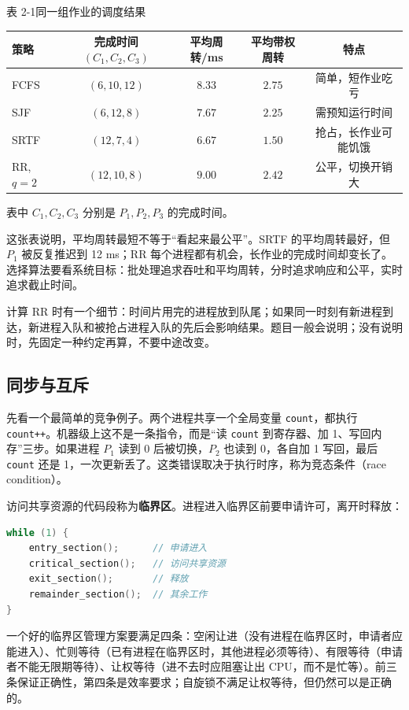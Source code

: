 \begin{tablebox}{表 2-1\quad 同一组作业的调度结果}
\centering
\begin{tabular}{lcccc}
\toprule
策略 & 完成时间 $(C_1,C_2,C_3)$ & 平均周转/ms & 平均带权周转 & 特点 \\
\midrule
FCFS & $(6,10,12)$ & $8.33$ & $2.75$ & 简单，短作业吃亏 \\
SJF  & $(6,12,8)$  & $7.67$ & $2.25$ & 需预知运行时间 \\
SRTF & $(12,7,4)$  & $6.67$ & $1.50$ & 抢占，长作业可能饥饿 \\
RR, $q=2$ & $(12,10,8)$ & $9.00$ & $2.42$ & 公平，切换开销大 \\
\bottomrule
\end{tabular}

{\small 表中 $C_1,C_2,C_3$ 分别是 $P_1,P_2,P_3$ 的完成时间。}
\end{tablebox}

这张表说明，平均周转最短不等于“看起来最公平”。SRTF 的平均周转最好，但 $P_1$ 被反复推迟到 12 ms；RR 每个进程都有机会，长作业的完成时间却变长了。选择算法要看系统目标：批处理追求吞吐和平均周转，分时追求响应和公平，实时追求截止时间。

计算 RR 时有一个细节：时间片用完的进程放到队尾；如果同一时刻有新进程到达，新进程入队和被抢占进程入队的先后会影响结果。题目一般会说明；没有说明时，先固定一种约定再算，不要中途改变。

\subsection{同步与互斥}

先看一个最简单的竞争例子。两个进程共享一个全局变量 \texttt{count}，都执行 \texttt{count++}。机器级上这不是一条指令，而是“读 \texttt{count} 到寄存器、加 1、写回内存”三步。如果进程 $P_1$ 读到 0 后被切换，$P_2$ 也读到 0，各自加 1 写回，最后 \texttt{count} 还是 1，一次更新丢了。这类错误取决于执行时序，称为竞态条件（race condition）。

访问共享资源的代码段称为\textbf{临界区}。进程进入临界区前要申请许可，离开时释放：

\begin{lstlisting}[language=C]
while (1) {
    entry_section();      // 申请进入
    critical_section();   // 访问共享资源
    exit_section();       // 释放
    remainder_section();  // 其余工作
}
\end{lstlisting}

一个好的临界区管理方案要满足四条：空闲让进（没有进程在临界区时，申请者应能进入）、忙则等待（已有进程在临界区时，其他进程必须等待）、有限等待（申请者不能无限期等待）、让权等待（进不去时应阻塞让出 CPU，而不是忙等）。前三条保证正确性，第四条是效率要求；自旋锁不满足让权等待，但仍然可以是正确的。

